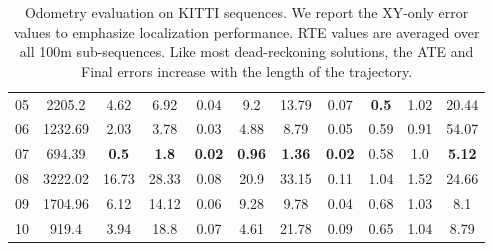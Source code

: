 \begin{table}[h]
{\begin{tabular}{c|c|ccc|ccc|ccc}
            05            & 2205.2          & 4.62                              & 6.92                                & 0.04                                         & 9.2           & 13.79         & 0.07          & \textbf{0.5} & 1.02          & 20.44         \\
            06            & 1232.69         & 2.03                              & 3.78                                & 0.03                                         & 4.88          & 8.79          & 0.05          & 0.59         & 0.91          & 54.07         \\
            07            & 694.39          & \textbf{0.5}                      & \textbf{1.8}                        & \textbf{0.02}                                & \textbf{0.96} & \textbf{1.36} & \textbf{0.02} & 0.58         & 1.0           & \textbf{5.12} \\
            08            & 3222.02         & 16.73                             & 28.33                               & 0.08                                         & 20.9          & 33.15         & 0.11          & 1.04         & 1.52          & 24.66         \\
            09            & 1704.96         & 6.12                              & 14.12                               & 0.06                                         & 9.28          & 9.78          & 0.04          & 0.68         & 1.03          & 8.1           \\
            10            & 919.4           & 3.94                              & 18.8                                & 0.07                                         & 4.61          & 21.78         & 0.09          & 0.65         & 1.04          & 8.79          \\
            \hline
        \end{tabular}
    }
    \caption{Odometry evaluation on KITTI sequences. We report the XY-only error values to emphasize localization performance. RTE values are averaged over all 100m sub-sequences. Like most dead-reckoning solutions, the ATE and Final errors increase with the length of the trajectory.}
    \label{tab:odom-kitti}
\end{table}

